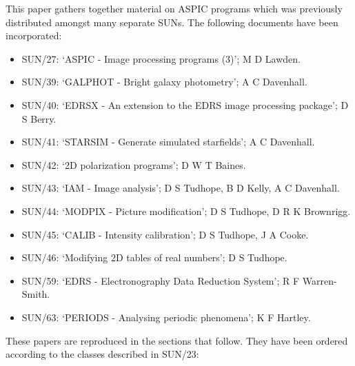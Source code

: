 This paper gathers together material on ASPIC programs which was previously
distributed amongst many separate SUNs.
The following documents have been incorporated:
\begin{itemize}
\item SUN/27: `ASPIC - Image processing programs (3)'; M D Lawden.
\item SUN/39: `GALPHOT - Bright galaxy photometry'; A C Davenhall.
\item SUN/40: `EDRSX - An extension to the EDRS image processing package'; D S
Berry.
\item SUN/41: `STARSIM - Generate simulated starfields'; A C Davenhall.
\item SUN/42: `2D polarization programs'; D W T Baines.
\item SUN/43: `IAM - Image analysis'; D S Tudhope, B D Kelly, A C Davenhall.
\item SUN/44: `MODPIX - Picture modification'; D S Tudhope, D R K Brownrigg.
\item SUN/45: `CALIB - Intensity calibration'; D S Tudhope, J A Cooke.
\item SUN/46: `Modifying 2D tables of real numbers'; D S Tudhope.
\item SUN/59: `EDRS - Electronography Data Reduction System'; R F Warren-Smith.
\item SUN/63: `PERIODS - Analysing periodic phenomena'; K F Hartley.
\end{itemize}
These papers are reproduced in the sections that follow.
They have been ordered according to the classes described in SUN/23:
